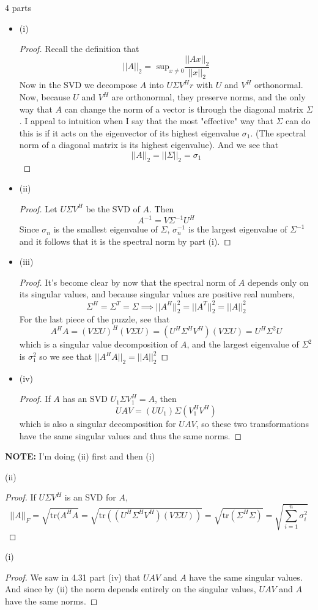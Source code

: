 \documentclass[12pt]{amsart}
\newenvironment{problem}[2][Problem]{\begin{trivlist}
\item[\hskip \labelsep {\bfseries #1}\hskip \labelsep {\bfseries #2.}]}{\end{trivlist}}
\begin{document}
\begin{problem}{31} 4 parts
\begin{itemize}
\item (i) \begin{proof}
Recall the definition that
$$||A||_2 = \text{ sup}_{x \neq 0} \frac{||Ax||_2}{||x||_2}$$
Now in the SVD we decompose $A$ into $U\Sigma V^Hr$ with $U$ and $V^H$ orthonormal. Now, because $U$ and $V^H$ are orthonormal, they preserve norms, and the only way that $A$ can change the norm of a vector is through the diagonal matrix $\Sigma$. I appeal to intuition when I say that the most "effective" way that $\Sigma$ can do this is if it acts on the eigenvector of its highest eigenvalue $\sigma_1$. (The spectral norm of a diagonal matrix is its highest eigenvalue). And we see that  $$||A||_2 = ||\Sigma||_2 = \sigma_1$$
\end{proof}
\item (ii) \begin{proof}
Let $U \Sigma V^H$ be the SVD of $A$. Then
$$ A^{-1} = V \Sigma^{-1} U^H$$
Since $\sigma_n$ is the smallest eigenvalue of $\Sigma$, $\sigma_n^{-1}$ is the largest eigenvalue of $\Sigma^{-1}$ and it follows that it is the spectral norm by part (i).
\end{proof}
\item (iii) \begin{proof}
It's become clear by now that the spectral norm of $A$ depends only on its singular values, and because singular values are positive real numbers,
$$
\Sigma^H = \Sigma^T = \Sigma \implies ||A^H||_2^2 = ||A^T||_2^2 = ||A||_2^2
$$
For the last piece of the puzzle, see that
$$A^HA = (V \Sigma U)^H(V \Sigma U) = (U^H  \Sigma^H V^H)(V \Sigma U) = U^H \Sigma^2 U$$
which is a singular value decomposition of $A$, and the largest eigenvalue of $\Sigma^2$ is $\sigma_1^2$ so we see that $||A^HA||_2 = ||A||_2^2 $
\end{proof}
\item (iv) \begin{proof}
If $A$ has an SVD $U_1 \Sigma V_1^H = A$, then
$$ UAV = (UU_1) \Sigma (V_1^HV^H) $$
which is also a singular decomposition for $UAV$, so these two transformations have the same singular values and thus the same norms.
\end{proof}
\end{itemize}
\end{problem}

\begin{problem}{32} \textbf{NOTE:} I'm doing (ii) first and then (i)
\item (ii)
\begin{proof}
If $U\Sigma V^H$ is an SVD for $A$,
$$ ||A||_F = \sqrt{\text{tr}(A^HA} = \sqrt{\text{tr}((U^H  \Sigma^H V^H)(V \Sigma U))} = \sqrt{\text{tr}(\Sigma^H\Sigma)} = \sqrt{\sum_{i=1}^n \sigma_i^2} $$
\end{proof}
\item (i)
\begin{proof}
We saw in 4.31 part (iv) that $UAV$ and $A$ have the same singular values. And since by (ii) the norm depends entirely on the singular values, $UAV$ and $A$ have the same norms.
\end{proof}
\end{problem}
\end{document}
